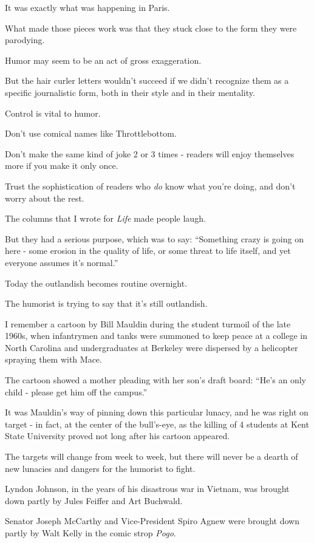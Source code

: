 \documentclass{book}
\numberwithin{equation}{section}
\begin{document}
It was exactly what was happening in Paris.

%
What made those pieces work was that they stuck close to the form they were parodying.

Humor may seem to be an act of gross exaggeration.

But the hair curler letters wouldn't succeed if we didn't recognize them as a specific journalistic form, both in their style and in their mentality.

Control is vital to humor.

Don't use comical names like Throttlebottom.

Don't make the same kind of joke 2 or 3 times - readers will enjoy themselves more if you make it only once.

Trust the sophistication of readers who \textit{do} know what you're doing, and don't worry about the rest.

The columns that I wrote for \textit{Life} made people laugh.

But they had a serious purpose, which was to say: ``Something crazy is going on here - some erosion in the quality of life, or some threat to life itself, and yet everyone assumes it's normal.''

Today the outlandish becomes routine overnight.

The humorist is trying to say that it's still outlandish.

%
I remember a cartoon by Bill Mauldin during the student turmoil of the late 1960s, when infantrymen and tanks were summoned to keep peace at a college in North Carolina and undergraduates at Berkeley were dispersed by a helicopter spraying them with Mace.

The cartoon showed a mother pleading with her son's draft board: ``He's an only child - please get him off the campus.''

It was Mauldin's way of pinning down this particular lunacy, and he was right on target - in fact, at the center of the bull's-eye, as the killing of 4 students at Kent State University proved not long after his cartoon appeared.

%
The targets will change from week to week, but there will never be a dearth of new lunacies and dangers for the humorist to fight.

Lyndon Johnson, in the years of his disastrous war in Vietnam, was brought down partly by Jules Feiffer and Art Buchwald.

Senator Joseph McCarthy and Vice-President Spiro Agnew were brought down partly by Walt Kelly in the comic strop \textit{Pogo}.
\end{document}
